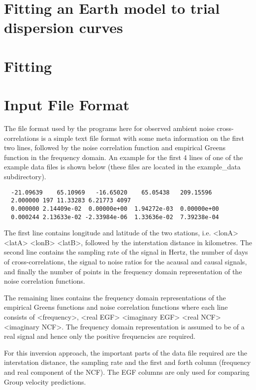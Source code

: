 \documentclass{article}
\begin{document}
\section{Fitting an Earth model to trial dispersion curves}

\section{Fitting}

  \appendix
  
\section{Input File Format}

The file format used by the programs here for observed ambient noise
cross-correlations is a simple text file format with some meta
information on the first two lines, followed by the noise correlation
function and empirical Greens function in the frequency domain.  An
example for the first 4 lines of one of the example data files is
shown below (these files are located in the example\_data
subdirectory).

\begin{verbatim}
  -21.09639    65.10969   -16.65020    65.05438   209.15596
  2.000000 197 11.33283 6.21773 4097
  0.000000 2.14409e-02  0.00000e+00  1.94272e-03  0.00000e+00
  0.000244 2.13633e-02 -2.33984e-06  1.33636e-02  7.39238e-04
\end{verbatim}

The first line contains longitude and latitude of the two stations,
i.e. <lonA> <latA> <lonB> <latB>, followed by the interstation
distance in kilometres. The second line contains the sampling rate of
the signal in Hertz, the number of days of cross-correlations, the
signal to noise ratios for the acausal and causal signals, and finally
the number of points in the frequency domain representation of the
noise correlation functions.

The remaining lines contains the frequency domain representations of
the empirical Greens functions and noise correlation functions where
each line consists of <frequency>, <real EGF> <imaginary EGF> <real
NCF> <imaginary NCF>. The frequency domain representation is assumed
to be of a real signal and hence only the positive frequencies are
required.

For this inversion approach, the important parts of the data file
required are the interstation distance, the sampling rate and the
first and forth column (frequency and real component of the NCF). The
EGF columns are only used for comparing Group velocity predictions.
\end{document}
